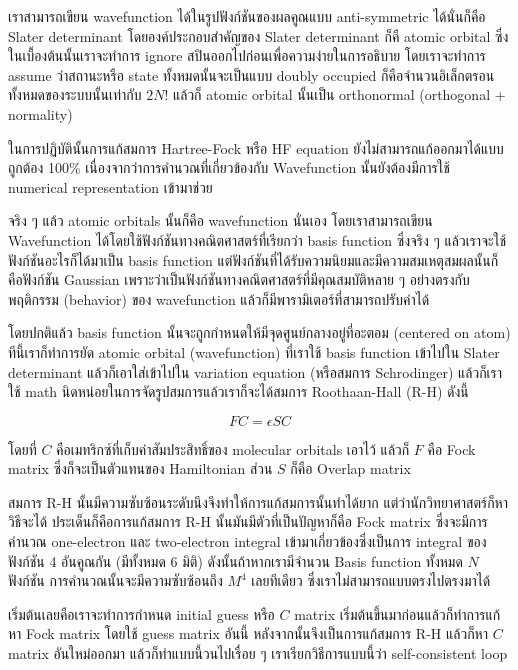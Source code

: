 เราสามารถเขียน wavefunction ได้ในรูปฟังก์ชันของผลคูณแบบ anti-symmetric ได้นั่นก็คือ Slater determinant
โดยองค์ประกอบสำคัญของ Slater determinant ก็คื atomic orbital ซึ่งในเบื้องต้นนั้นเราจะทำการ ignore
สปินออกไปก่อนเพื่อความง่ายในการอธิบาย โดยเราจะทำการ assume ว่าสถานะหรือ state ทั้งหมดนั้นจะเป็นแบบ
doubly occupied ก็คือจำนวนอิเล็กตรอนทั้งหมดของระบบนั้นเท่ากับ $2N!$ แล้วก็ atomic orbital
นั้นเป็น orthonormal (orthogonal + normality)

ในการปฏิบัตินั้นการแก้สมการ Hartree-Fock หรือ HF equation ยังไม่สามารถแก้ออกมาได้แบบถูกต้อง 100\%
เนื่องจากว่าการคำนวณที่เกี่ยวข้องกับ Wavefunction นั้นยังต้องมีการใช้ numerical representation เข้ามาช่วย

จริง ๆ แล้ว atomic orbitals นั้นก็คือ wavefunction นั่นเอง โดยเราสามารถเขียน Wavefunction
ได้โดยใช้ฟังก์ชันทางคณิตศาสตร์ที่เรียกว่า basis function ซึ่งจริง ๆ แล้วเราจะใช้ฟังก์ชันอะไรก็ได้มาเป็น
basis function แต่ฟังก์ชันที่ได้รับความนิยมและมีความสมเหตุสมผลนั้นก็คือฟังก์ชัน Gaussian
เพราะว่าเป็นฟังก์ชันทางคณิตศาสตร์ที่มีคุณสมบัติหลาย ๆ อย่างตรงกับพฤติกรรม (behavior) ของ wavefunction
แล้วก็มีพารามิเตอร์ที่สามารถปรับค่าได้

โดยปกติแล้ว basis function นั้นจะถูกกำหนดให้มีจุดศูนย์กลางอยู่ที่อะตอม (centered on atom)
ทีนี้เราก็ทำการยัด atomic orbital (wavefunction) ที่เราใช้ basis function เข้าไปใน Slater
determinant แล้วก็เอาใส่เข้าไปใน variation equation (หรือสมการ Schrodinger)
แล้วก็เราใช้ math นิดหน่อยในการจัดรูปสมการแล้วเราก็จะได้สมการ Roothaan-Hall (R-H) ดังนี้

\begin{equation}
    FC = \epsilon SC
\end{equation}

โดยที่ $C$ คือเมทริกซ์ที่เก็บค่าสัมประสิทธิ์ของ molecular orbitals เอาไว้ แล้วก็ $F$ คือ Fock matrix
ซึ่งก็จะเป็นตัวแทนของ Hamiltonian ส่วน $S$ ก็คือ Overlap matrix

สมการ R-H นั้นมีความซับซ้อนระดับนึงจึงทำให้การแก้สมการนั้นทำได้ยาก แต่ว่านักวิทยาศาสตร์ก็หาวิธีจะได้
ประเด็นก็คือการแก้สมการ R-H นั้นมันมีตัวที่เป็นปัญหาก็คือ Fock matrix ซึ่งจะมีการคำนวณ one-electron
และ two-electron integral เข้ามาเกี่ยวข้องซึ่งเป็นการ integral ของฟังก์ชัน 4 อันคูณกัน
(มีทั้งหมด 6 มิติ) ดังนั้นถ้าหากเรามีจำนวน Basis function ทั้งหมด $N$ ฟังก์ชัน
การคำนวณนั้นจะมีความซับซ้อนถึง $M^{4}$ เลยทีเดียว ซึ่งเราไม่สามารถแบบตรงไปตรงมาได้

เริ่มต้นเลยคือเราจะทำการกำหนด initial guess หรือ $C$ matrix เริ่มต้นขึ้นมาก่อนแล้วก็ทำการแก้หา
Fock matrix โดยใช้ guess matrix อันนี้ หลังจากนั้นจึงเป็นการแก้สมการ R-H แล้วก็หา $C$ matrix
อันใหม่ออกมา แล้วก็ทำแบบนี้วนไปเรื่อย ๆ เราเรียกวิธีการแบบนี้ว่า self-consistent loop

